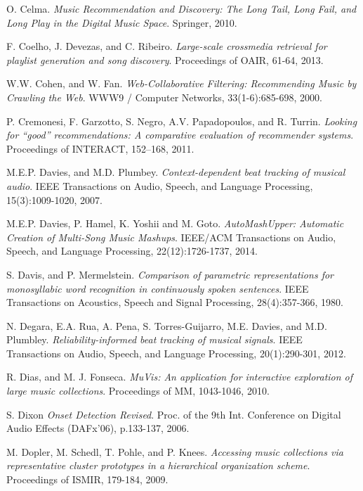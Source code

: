 \documentclass[11pt, oneside, openright]{Thesis} %
\begin{document}
\begin{thebibliography}{99}
O. Celma. 
\textit{Music Recommendation and Discovery: The Long Tail, Long Fail, and Long Play in the Digital Music Space}.
Springer, 2010.

F. Coelho, J. Devezas, and C. Ribeiro.
\textit{Large-scale crossmedia retrieval for playlist generation and song discovery}.
Proceedings of OAIR, 61-64, 2013.

W.W. Cohen, and W. Fan.
\textit{Web-Collaborative Filtering: Recommending Music by Crawling the Web}.
WWW9 / Computer Networks, 33(1-6):685-698, 2000.

P. Cremonesi, F. Garzotto, S. Negro, A.V. Papadopoulos, and R. Turrin. 
\textit{Looking for “good” recommendations: A comparative evaluation of recommender systems}. 
Proceedings of INTERACT, 152–168, 2011.

M.E.P. Davies, and M.D. Plumbey.
\textit{Context-dependent beat tracking of musical audio}.
IEEE Transactions on Audio, Speech, and Language Processing, 15(3):1009-1020, 2007.

M.E.P. Davies, P. Hamel, K. Yoshii and M. Goto.
\textit{AutoMashUpper: Automatic Creation of Multi-Song Music Mashups}. 
IEEE/ACM Transactions on Audio, Speech, and Language Processing, 22(12):1726-1737, 2014.

S. Davis, and P. Mermelstein.
\textit{Comparison of parametric representations for monosyllabic word recognition in continuously spoken sentences}.
IEEE Transactions on Acoustics, Speech and Signal Processing, 28(4):357-366, 1980.

N. Degara, E.A. Rua, A. Pena, S. Torres-Guijarro, M.E. Davies, and M.D. Plumbley.
\textit{Reliability-informed beat tracking of musical signals}.
IEEE Transactions on Audio, Speech, and Language Processing, 20(1):290-301, 2012.

R. Dias, and M. J. Fonseca.
\textit{MuVis: An application for interactive exploration of large music collections}.
Proceedings of MM, 1043-1046, 2010.

S. Dixon
\textit{Onset Detection Revised}.
Proc. of the 9th Int. Conference on Digital Audio Effects (DAFx’06), p.133-137, 2006.

M. Dopler, M. Schedl, T. Pohle, and P. Knees.
\textit{Accessing music collections via representative cluster prototypes in a hierarchical organization scheme}.
Proceedings of ISMIR, 179-184, 2009.


\end{thebibliography}
\end{document}
